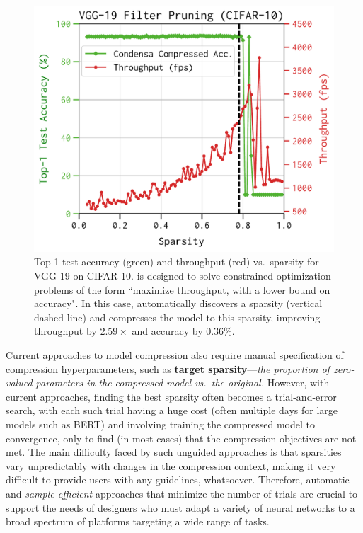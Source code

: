 \begin{figure}[!h]
\centering
\includegraphics[width=0.5\linewidth]{img/vgg19_bn_filter_intro_v2.pdf}
\caption{Top-1 test accuracy (green) and throughput (red) vs.\ sparsity for VGG-19 on CIFAR-10.
\algoName is designed to solve constrained optimization problems of the form ``maximize throughput, with a lower bound on accuracy". In this case, \algoName automatically discovers a sparsity (vertical dashed line) and compresses the model to this sparsity,
improving throughput by $2.59\times$ and accuracy by $0.36\%$.
}
\vspace{-10pt}
\label{fig:vgg-intro}
\end{figure}

%
Current approaches to model compression
also require manual specification of compression hyperparameters, such
as {\bf target sparsity}---{\em the proportion of zero-valued parameters in the
compressed model vs.\ the original.}
%
However, with current approaches, finding the best sparsity 
often becomes a trial-and-error search, with
each such trial having a huge cost (often multiple days for large models such as BERT) and involving training the compressed model to convergence,
only to find (in most cases) that the compression objectives are not met.
%
The main difficulty faced by such unguided approaches is
that sparsities 
vary unpredictably with changes in the compression context,
making it very difficult to provide users with any guidelines, whatsoever.
%
Therefore, automatic and {\em sample-efficient} approaches that minimize the number of trials are crucial
to support the needs of designers who must adapt
a variety of neural networks to a broad spectrum of platforms targeting a wide
range of tasks.

